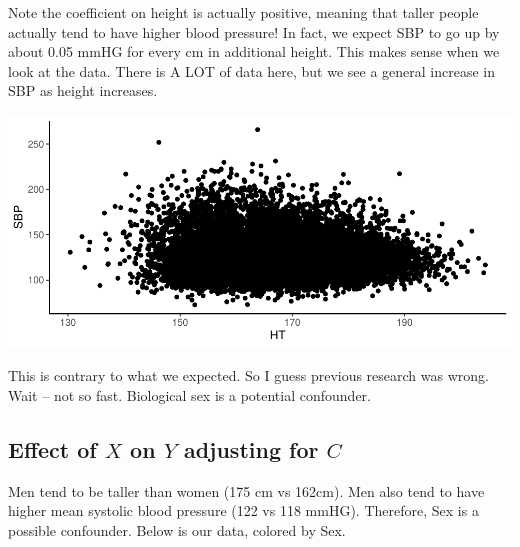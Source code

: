 \documentclass[]{book}
\newenvironment{Shaded}{\begin{snugshade}}{\end{snugshade}}
\newcommand{\DataTypeTok}[1]{\textcolor[rgb]{0.13,0.29,0.53}{#1}}
\newcommand{\KeywordTok}[1]{\textcolor[rgb]{0.13,0.29,0.53}{\textbf{#1}}}
\newcommand{\NormalTok}[1]{#1}
\newcommand{\OperatorTok}[1]{\textcolor[rgb]{0.81,0.36,0.00}{\textbf{#1}}}
\newcommand{\StringTok}[1]{\textcolor[rgb]{0.31,0.60,0.02}{#1}}
\begin{document}
Note the coefficient on height is actually positive, meaning that taller people actually tend to have higher blood pressure! In fact, we expect SBP to go up by about 0.05 mmHG for every cm in additional height. This makes sense when we look at the data. There is A LOT of data here, but we see a general increase in SBP as height increases.

\begin{Shaded}
\end{Shaded}

\includegraphics{MA206supplement_files/figure-latex/unnamed-chunk-4-1.pdf}

This is contrary to what we expected. So I guess previous research was wrong. Wait -- not so fast. Biological sex is a potential confounder.

\hypertarget{effect-of-x-on-y-adjusting-for-c}{%
\subsection{\texorpdfstring{Effect of \(X\) on \(Y\) adjusting for \(C\)}{Effect of X on Y adjusting for C}}\label{effect-of-x-on-y-adjusting-for-c}}

Men tend to be taller than women (175 cm vs 162cm). Men also tend to have higher mean systolic blood pressure (122 vs 118 mmHG). Therefore, Sex is a possible confounder. Below is our data, colored by Sex.
\end{document}
